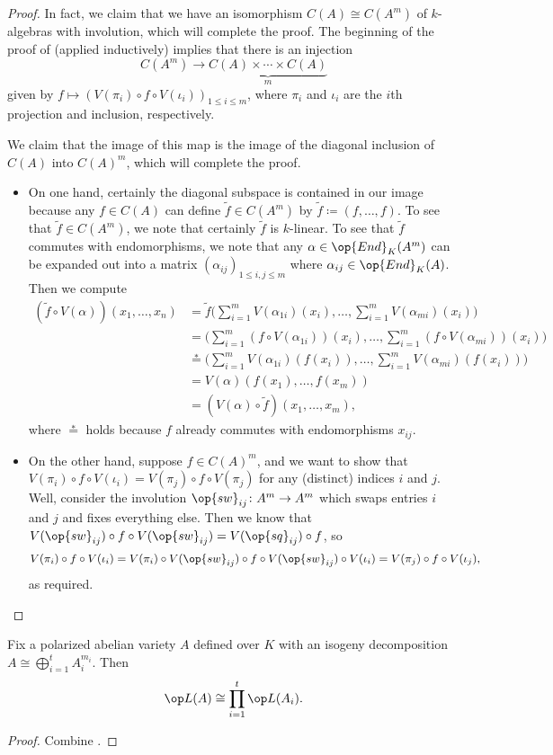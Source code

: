 \documentclass{article}
\begin{document}
\begin{proof}
	In fact, we claim that we have an isomorphism $C(A)\cong C(A^m)$ of $k$-algebras with involution, which will complete the proof. The beginning of the proof of  (applied inductively) implies that there is an injection
	\[C(A^m)\to\underbrace{C(A)\times\cdots\times C(A)}_m\]
	given by $f\mapsto(V(\pi_i)\circ f\circ V(\iota_i))_{1\le i\le m}$, where $\pi_i$ and $\iota_i$ are the $i$th projection and inclusion, respectively.
	
	We claim that the image of this map is the image of the diagonal inclusion of $C(A)$ into $C(A)^m$, which will complete the proof.
	\begin{itemize}
		\item On one hand, certainly the diagonal subspace is contained in our image because any $f\in C(A)$ can define $\widetilde f\in C(A^m)$ by $\widetilde f\coloneqq(f,\ldots,f)$. To see that $\widetilde f\in C(A^m)$, we note that certainly $\widetilde f$ is $k$-linear. To see that $\widetilde f$ commutes with endomorphisms, we note that any $\alpha\in\op{End}_K(A^m)$ can be expanded out into a matrix $(\alpha_{ij})_{1\le i,j\le m}$ where $\alpha_{ij}\in\op{End}_K(A)$. Then we compute
		\begin{align*}
			\left(\widetilde f\circ V(\alpha)\right)(x_1,\ldots,x_n) &= \widetilde f\Bigg(\sum_{i=1}^mV(\alpha_{1i})(x_i),\ldots,\sum_{i=1}^mV(\alpha_{mi})(x_i)\Bigg) \\
			&= \Bigg(\sum_{i=1}^m(f\circ V(\alpha_{1i}))(x_i),\ldots,\sum_{i=1}^m(f\circ V(\alpha_{mi}))(x_i)\Bigg) \\
			&\stackrel*= \Bigg(\sum_{i=1}^mV(\alpha_{1i})(f(x_i)),\ldots,\sum_{i=1}^m V(\alpha_{mi})(f(x_i))\Bigg) \\
			&= V(\alpha)(f(x_1),\ldots,f(x_m)) \\
			&= \left(V(\alpha)\circ\widetilde f\right)(x_1,\ldots,x_m),
		\end{align*}
		where $\stackrel*=$ holds because $f$ already commutes with endomorphisms $x_{ij}$.
		\item On the other hand, suppose $f\in C(A)^m$, and we want to show that $V(\pi_i)\circ f\circ V(\iota_i)=V(\pi_j)\circ f\circ V(\pi_j)$ for any (distinct) indices $i$ and $j$. Well, consider the involution $\op{sw}_{ij}\colon A^m\to A^m$ which swaps entries $i$ and $j$ and fixes everything else. Then we know that $V({\op{sw}_{ij}})\circ f\circ V({\op{sw}_{ij}})=V({\op{sq}_{ij}})\circ f$, so
		\[V(\pi_i)\circ f\circ V(\iota_i) = V(\pi_i)\circ V({\op{sw}_{ij}}) \circ f\circ V({\op{sw}_{ij}})\circ V(\iota_i) = V(\pi_j)\circ f\circ V(\iota_j),\]
		as required.
		\qedhere
	\end{itemize}
\end{proof}
\begin{proposition} \label{prop:lefschetz-by-isog-decomp}
	Fix a polarized abelian variety $A$ defined over $K$ with an isogeny decomposition $A\cong\bigoplus_{i=1}^tA_i^{m_i}$. Then
	\[\op L(A)\cong\prod_{i=1}^t\op L(A_i).\]
\end{proposition}
\begin{proof}
	Combine .
\end{proof}
\end{document}
